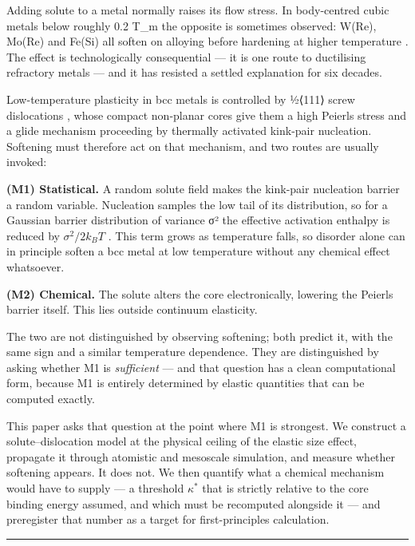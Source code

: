 Adding solute to a metal normally raises its flow stress. In body-centred cubic metals below roughly 0.2 T\_m the opposite is sometimes observed: W(Re), Mo(Re) and Fe(Si) all soften on alloying before hardening at higher temperature \cite{christian1983}. The effect is technologically consequential --- it is one route to ductilising refractory metals --- and it has resisted a settled explanation for six decades.

Low-temperature plasticity in bcc metals is controlled by ½⟨111⟩ screw dislocations \cite{hirth1982,dezerald2014}, whose compact non-planar cores give them a high Peierls stress and a glide mechanism proceeding by thermally activated kink-pair nucleation. Softening must therefore act on that mechanism, and two routes are usually invoked:

\textbf{(M1) Statistical.} A random solute field makes the kink-pair nucleation barrier a random variable. Nucleation samples the low tail of its distribution, so for a Gaussian barrier distribution of variance σ² the effective activation enthalpy is reduced by \(\sigma^2/2k_BT\) \cite{labusch1970,kocks1975}. This term grows as temperature falls, so disorder alone can in principle soften a bcc metal at low temperature without any chemical effect whatsoever.

\textbf{(M2) Chemical.} The solute alters the core electronically, lowering the Peierls barrier itself. This lies outside continuum elasticity.

The two are not distinguished by observing softening; both predict it, with the same sign and a similar temperature dependence. They are distinguished by asking whether M1 is \emph{sufficient} --- and that question has a clean computational form, because M1 is entirely determined by elastic quantities that can be computed exactly.

This paper asks that question at the point where M1 is strongest. We construct a solute--dislocation model at the physical ceiling of the elastic size effect, propagate it through atomistic and mesoscale simulation, and measure whether softening appears. It does not. We then quantify what a chemical mechanism would have to supply --- a threshold \(\kappa^*\) that is strictly relative to the core binding energy assumed, and which must be recomputed alongside it --- and preregister that number as a target for first-principles calculation.

\begin{center}\rule{0.5\linewidth}{0.5pt}\end{center}

